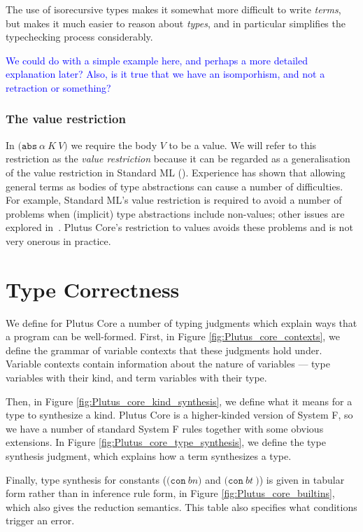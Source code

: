 \documentclass[a4paper]{article}
\newcommand{\blue}[1]{\textcolor{blue}{#1}}
\newcommand{\keyword}[1]{\texttt{#1}}
\newcommand{\construct}[1]{\texttt{(} #1 \texttt{)}}
\newcommand{\con}[1]{\construct{\keyword{con} ~ #1}}
\newcommand{\abs}[3]{\construct{\keyword{abs} ~ #1 ~ #2 ~ #3}}
\newcommand{\conT}[2]{\construct{\keyword{con} ~ #1 ~ #2}}
\begin{document}
\noindent The use of isorecursive types makes it somewhat more difficult to
write \textit{terms}, but makes it much easier to reason about
\textit{types}, and in particular simplifies the typechecking process
considerably.

\noindent\blue{We could do with a simple example here, and perhaps a more detailed explanation
  later?  Also, is it true that we have an isomporhism, and not a retraction or something?}


\subsubsection{The value restriction}
In $\abs{\alpha}{K}{V}$ we require the body $V$ to be a value. We will
refer to this restriction as the \textit{value restriction} because it
can be regarded as a generalisation of the value restriction in
Standard ML (\cite[22.7]{Pierce:TAPL}). Experience has shown that
allowing general terms as bodies of type abstractions can cause a
number of difficulties.  For example, Standard ML's value restriction
is required to avoid a number of problems when (implicit) type
abstractions include non-values; other issues are explored
in~\cite[2.4]{Ahmed:2017}. Plutus Core's restriction to values avoids
these problems and is not very onerous in practice.
  


\section{Type Correctness}

We define for Plutus Core a number of typing judgments which explain
ways that a program can be well-formed. First, in Figure
\ref{fig:Plutus_core_contexts}, we define the grammar of variable
contexts that these judgments hold under. Variable contexts contain
information about the nature of variables --- type variables with
their kind, and term variables with their type.

Then, in Figure \ref{fig:Plutus_core_kind_synthesis}, we define what
it means for a type to synthesize a kind. Plutus Core is a
higher-kinded version of System F, so we have a number of standard
System F rules together with some obvious extensions. In Figure
\ref{fig:Plutus_core_type_synthesis}, we define the type synthesis
judgment, which explains how a term synthesizes a type.

Finally, type synthesis for constants ($\con{bn}$ and $\conT{bt}\!\!$)
is given in tabular form rather than in inference rule form, in Figure \ref{fig:Plutus_core_builtins}, which also gives the reduction semantics. This table also specifies what conditions trigger an error.
\end{document}
